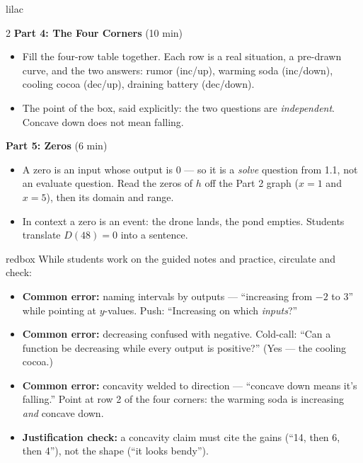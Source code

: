 \documentclass[10pt]{article}
\begin{document}
\begin{skillbox}[Lesson]{lilac}
\begin{multicols}{2}
\textbf{Part 4: The Four Corners} (10 min)

\begin{itemize}
  \item Fill the four-row table together. Each row is a real situation, a
        pre-drawn curve, and the two answers: rumor (inc/up), warming soda
        (inc/down), cooling cocoa (dec/up), draining battery (dec/down).
  \item The point of the box, said explicitly: the two questions are
        \textit{independent}. Concave down does not mean falling.
\end{itemize}

\textbf{Part 5: Zeros} (6 min)

\begin{itemize}
  \item A zero is an input whose output is 0 --- so it is a \textit{solve}
        question from 1.1, not an evaluate question. Read the zeros of $h$ off
        the Part 2 graph ($x = 1$ and $x = 5$), then its domain and range.
  \item In context a zero is an event: the drone lands, the pond empties.
        Students translate $D(48) = 0$ into a sentence.
\end{itemize}
\end{multicols}
\end{skillbox}

\begin{skillbox}{redbox}
While students work on the guided notes and practice, circulate and check:
\begin{itemize}
  \item \textbf{Common error:} naming intervals by outputs --- ``increasing
        from $-2$ to 3'' while pointing at $y$-values. Push: ``Increasing on
        which \textit{inputs}?''
  \item \textbf{Common error:} decreasing confused with negative. Cold-call:
        ``Can a function be decreasing while every output is positive?''
        (Yes --- the cooling cocoa.)
  \item \textbf{Common error:} concavity welded to direction --- ``concave
        down means it's falling.'' Point at row 2 of the four corners: the
        warming soda is increasing \textit{and} concave down.
  \item \textbf{Justification check:} a concavity claim must cite the gains
        (``14, then 6, then 4''), not the shape (``it looks bendy'').
\end{itemize}
\end{skillbox}
\end{document}
